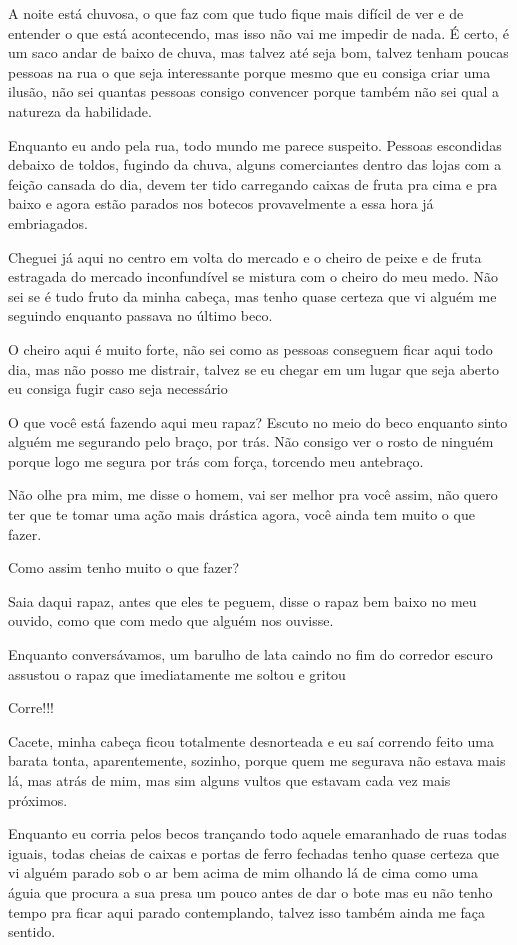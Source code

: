A noite está chuvosa, o que faz com que tudo fique mais difícil de ver e de entender o que está acontecendo, mas isso não vai me impedir de nada. É certo, é um saco andar de baixo de chuva, mas talvez até seja bom, talvez tenham poucas pessoas na rua o que seja interessante porque mesmo que eu consiga criar uma ilusão, não sei quantas pessoas consigo convencer porque também não sei qual a natureza da habilidade.

Enquanto eu ando pela rua, todo mundo me parece suspeito. Pessoas escondidas debaixo de toldos, fugindo da chuva, alguns comerciantes dentro das lojas com a feição cansada do dia, devem ter tido carregando caixas de fruta pra cima e pra baixo e agora estão parados nos botecos provavelmente a essa hora já embriagados.

Cheguei já aqui no centro em volta do mercado e o cheiro de peixe e de fruta estragada do mercado inconfundível se mistura com o cheiro do meu medo. Não sei se é tudo fruto da minha cabeça, mas tenho quase certeza que vi alguém me seguindo enquanto passava no último beco.

O cheiro aqui é muito forte, não sei como as pessoas conseguem ficar aqui todo dia, mas não posso me distrair, talvez se eu chegar em um lugar que seja aberto eu consiga fugir caso seja necessário

O que você está fazendo aqui meu rapaz? Escuto no meio do beco enquanto sinto alguém me segurando pelo braço, por trás. Não consigo ver o rosto de ninguém porque logo me segura por trás com força, torcendo meu antebraço.

Não olhe pra mim, me disse o homem, vai ser melhor pra você assim, não quero ter que te tomar uma ação mais drástica agora, você ainda tem muito o que fazer.

Como assim tenho muito o que fazer?

Saia daqui rapaz, antes que eles te peguem, disse o rapaz bem baixo no meu ouvido, como que com medo que alguém nos ouvisse.

Enquanto conversávamos, um barulho de lata caindo no fim do corredor escuro assustou o rapaz que imediatamente me soltou e gritou

Corre!!!

Cacete, minha cabeça ficou totalmente desnorteada e eu saí correndo feito uma barata tonta, aparentemente, sozinho, porque quem me segurava não estava mais lá, mas atrás de mim, mas sim alguns vultos que estavam cada vez mais próximos.

Enquanto eu corria pelos becos trançando todo aquele emaranhado de ruas todas iguais, todas cheias de caixas e portas de ferro fechadas tenho quase certeza que vi alguém parado sob o ar bem acima de mim olhando lá de cima como uma águia que procura a sua presa um pouco antes de dar o bote mas eu não tenho tempo pra ficar aqui parado contemplando, talvez isso também ainda me faça sentido.

